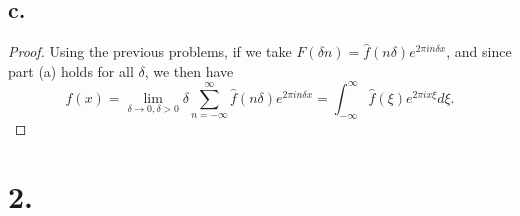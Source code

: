 \documentclass{article}
\begin{document}
\subsection*{c.}
\begin{proof}
    Using the previous problems, if we take $F(\delta n) = \hat{f}(n \delta)e^{2 \pi i n \delta x}$, and since part (a) holds for all $\delta$, we then have 
    \[
    f(x) = \lim\limits_{\delta \to 0, \delta > 0} \delta \sum\limits_{n = -\infty}^{\infty} \hat{f}(n \delta)e^{2 \pi i n \delta x} = \int_{ -\infty}^{\infty} \hat{f}(\xi)e^{2 \pi i x \xi} d\xi. 
    \]
\end{proof}

\section*{2.}
\end{document}
